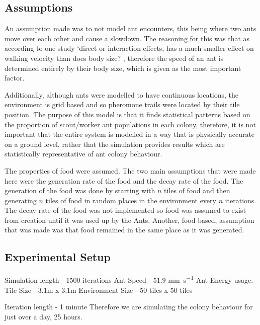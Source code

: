  \subsection{Assumptions}
An assumption made was to not model ant encounters, this being where two ants move over each other and cause a slowdown. The reasoning for this was that as according to one study `direct or interaction effects, has a much smaller effect on walking velocity than does body size? \cite{Burd2003}, therefore the speed of an ant is determined entirely by their body size, which is given as the most important factor.\par
Additionally, although ants were modelled to have continuous locations, the environment is grid based and so pheromone trails were located by their tile position. The purpose of this model is that it finds statistical patterns based on the proportion of scout/worker ant populations in each colony, therefore, it is not important that the entire system is modelled in a way that is physically accurate on a ground level, rather that the simulation provides results which are statistically representative of ant colony behaviour.\par 
The properties of food were assumed. The two main assumptions that were made here were the generation rate of the food and the decay rate of the food. The generation of the food was done by starting with $n$ tiles of food and then generating $n$ tiles of food in random places in the environment every $n$ iterations. The decay rate of the food was not implemented so food was assumed to exist from creation until it was used up by the Ants. Another, food based, assumption that was made was that food remained in the same place as it was generated.\par
 
 \subsection{Experimental Setup}

Simulation length - 1500 iterations
Ant Speed - $51.9$ \si{mm.s^{-1}} \cite{Burd2003}
Ant Energy usage. 
Tile Size - 3.1m x 3.1m
Environment Size - 50 tiles x 50 tiles

Iteration length - 1 minute
Therefore we are simulating the colony behaviour for just over a day, 25 hours.

